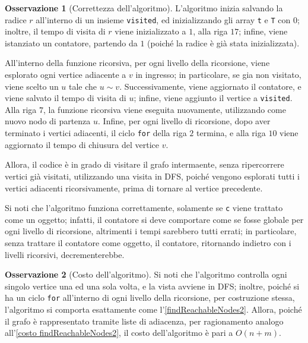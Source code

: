 \documentclass[14pt]{extreport}
\theoremstyle{definition}
\theoremstyle{definition}
\newtheorem{remark}{Osservazione}[subsection]
\begin{document}
\begin{remark}[Correttezza dell'algoritmo]
    L'algoritmo inizia salvando la radice $r$ all'interno di un insieme \texttt{visited}, ed inizializzando gli array \texttt{t} e \texttt{T} con $0$; inoltre, il tempo di visita di $r$ viene inizializzato a $1$, alla riga $17$; infine, viene istanziato un contatore, partendo da $1$ (poiché la radice è già stata inizializzata).

    All'interno della funzione ricorsiva, per ogni livello della ricorsione, viene esplorato ogni vertice adiacente a $v$ in ingresso; in particolare, se gia non visitato, viene scelto un $u$ tale che $u \sim v$. Successivamente, viene aggiornato il contatore, e viene salvato il tempo di visita di $u$; infine, viene aggiunto il vertice a \texttt{visited}. Alla riga $7$, la funzione ricorsiva viene eseguita nuovamente, utilizzando come nuovo nodo di partenza $u$. Infine, per ogni livello di ricorsione, dopo aver terminato i vertici adiacenti, il ciclo \texttt{for} della riga $2$ termina, e alla riga $10$ viene aggiornato il tempo di chiusura del vertice $v$.

    Allora, il codice è in grado di visitare il grafo intermaente, senza ripercorrere vertici già visitati, utilizzando una visita in DFS, poiché vengono esplorati tutti i vertici adiacenti ricorsivamente, prima di tornare al vertice precedente.

    Si noti che l'algoritmo funziona correttamente, solamente se \texttt{c} viene trattato come un oggetto; infatti, il contatore si deve comportare come se fosse globale per ogni livello di ricorsione, altrimenti i tempi sarebbero tutti errati; in particolare, senza trattare il contatore come oggetto, il contatore, ritornando indietro con i livelli ricorsivi, decrementerebbe.
\end{remark}

\begin{remark}[Costo dell'algoritmo]
    Si noti che l'algoritmo controlla ogni singolo vertice una ed una sola volta, e la vista avviene in DFS; inoltre, poiché si ha un ciclo \texttt{for} all'interno di ogni livello della ricorsione, per costruzione stessa, l'algoritmo si comporta esattamente come l'\cref{findReachableNodes2}. Allora, poiché il grafo è rappresentato tramite liste di adiacenza, per ragionamento analogo all'\cref{costo findReachableNodes2}, il costo dell'algoritmo è pari a $O(n + m)$.
\end{remark}
\end{document}
